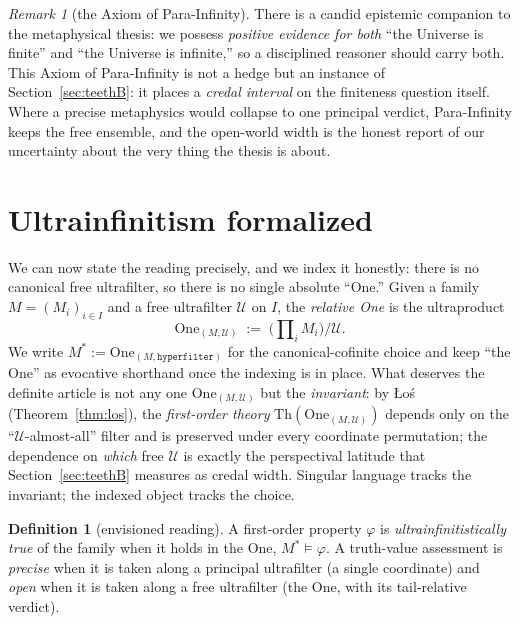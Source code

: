 \documentclass[]{article}
\theoremstyle{definition}
\newtheorem{definition}[theorem]{Definition}
\theoremstyle{remark}
\newtheorem{remark}[theorem]{Remark}
\newcommand{\code}[1]{\texttt{#1}}
\newcommand{\Uf}{\mathcal{U}}
\newcommand{\limstar}{\ensuremath{M^{\!*}}}
\DeclareMathOperator{\uprod}{\textstyle\prod}
\begin{document}
\begin{remark}[the Axiom of Para-Infinity]
\label{rem:para}
There is a candid epistemic companion to the metaphysical thesis: we possess
\emph{positive evidence for both} ``the Universe is finite'' and ``the Universe is
infinite,'' so a disciplined reasoner should carry both. This Axiom of
Para-Infinity is not a hedge but an instance of Section~\ref{sec:teethB}: it places
a \emph{credal interval} on the finiteness question itself. Where a precise
metaphysics would collapse to one principal verdict, Para-Infinity keeps the free
ensemble, and the open-world width is the honest report of our uncertainty about the
very thing the thesis is about.
\end{remark}

\section{Ultrainfinitism formalized}
\label{sec:formal}

We can now state the reading precisely, and we index it honestly: there is no
canonical free ultrafilter, so there is no single absolute ``One.'' Given a family
$M=(M_i)_{i\in I}$ and a free ultrafilter $\Uf$ on $I$, the \emph{relative One} is
the ultraproduct
\[
  \textstyle
  \mathrm{One}_{(M,\Uf)} \;:=\; \bigl(\uprod_i M_i\bigr)/\Uf .
\]
We write $\limstar := \mathrm{One}_{(M,\code{hyperfilter})}$ for the canonical-cofinite
choice and keep ``the One'' as evocative shorthand once the indexing is in place.
What deserves the definite article is not any one $\mathrm{One}_{(M,\Uf)}$ but the
\emph{invariant}: by {\L}o\'s (Theorem~\ref{thm:los}), the \emph{first-order theory}
$\mathrm{Th}(\mathrm{One}_{(M,\Uf)})$ depends only on the ``$\Uf$-almost-all'' filter
and is preserved under every coordinate permutation; the dependence on \emph{which}
free $\Uf$ is exactly the perspectival latitude that Section~\ref{sec:teethB}
measures as credal width. Singular language tracks the invariant; the indexed
object tracks the choice.

\begin{definition}[envisioned reading]
\label{def:reading}
A first-order property $\varphi$ is \emph{ultrainfinitistically true} of the family
when it holds in the One, $\limstar\models\varphi$. A truth-value assessment is
\emph{precise} when it is taken along a principal ultrafilter (a single
coordinate) and \emph{open} when it is taken along a free ultrafilter (the One,
with its tail-relative verdict).
\end{definition}
\end{document}
